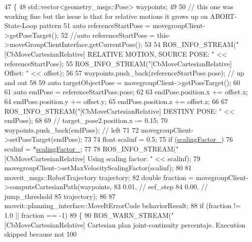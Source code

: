 \begin{DoxyCode}
47 \{
48   std::vector<geometry\_msgs::Pose> waypoints;
49 
50   \textcolor{comment}{// this one was working fine but the issue is that for relative motions it grows up on ABORT-State-Loop
       pattern}
51   \textcolor{keyword}{auto} referenceStartPose = movegroupClient->getPoseTarget(); 
52   \textcolor{comment}{//auto referenceStartPose = this->moveGroupClientInterface.getCurrentPose();}
53 
54   ROS\_INFO\_STREAM(\textcolor{stringliteral}{"[CbMoveCartesianRelative] RELATIVE MOTION, SOURCE POSE: "} << referenceStartPose);
55   ROS\_INFO\_STREAM(\textcolor{stringliteral}{"[CbMoveCartesianRelative] Offset: "} << offset);
56 
57   waypoints.push\_back(referenceStartPose.pose);  \textcolor{comment}{// up and out}
58 
59   \textcolor{keyword}{auto} targetObjectPose = movegroupClient->getPoseTarget();
60 
61   \textcolor{keyword}{auto} endPose = referenceStartPose.pose;
62 
63   endPose.position.x += offset.x;
64   endPose.position.y += offset.y;
65   endPose.position.z += offset.z;
66 
67   ROS\_INFO\_STREAM(\textcolor{stringliteral}{"[CbMoveCartesianRelative] DESTINY POSE: "} << endPose);
68 
69   \textcolor{comment}{// target\_pose2.position.x -= 0.15;}
70   waypoints.push\_back(endPose);  \textcolor{comment}{// left}
71 
72   movegroupClient->setPoseTarget(endPose);
73 
74   \textcolor{keywordtype}{float} scalinf = 0.5;
75   \textcolor{keywordflow}{if} (\hyperlink{classmove__group__interface__client_1_1CbMoveCartesianRelative_a62cdf88c437312ac79c8acc01519d634}{scalingFactor\_})
76     scalinf = *\hyperlink{classmove__group__interface__client_1_1CbMoveCartesianRelative_a62cdf88c437312ac79c8acc01519d634}{scalingFactor\_};
77 
78   ROS\_INFO\_STREAM(\textcolor{stringliteral}{"[CbMoveCartesianRelative] Using scaling factor: "} << scalinf);
79   movegroupClient->setMaxVelocityScalingFactor(scalinf);
80 
81   moveit\_msgs::RobotTrajectory trajectory;
82   \textcolor{keywordtype}{double} fraction = movegroupClient->computeCartesianPath(waypoints,
83                                                           0.01,  \textcolor{comment}{// eef\_step}
84                                                           0.00,  \textcolor{comment}{// jump\_threshold}
85                                                           trajectory);
86 
87   moveit::planning\_interface::MoveItErrorCode behaviorResult;
88   \textcolor{keywordflow}{if} (fraction != 1.0 || fraction == -1)
89   \{
90     ROS\_WARN\_STREAM(\textcolor{stringliteral}{"[CbMoveCartesianRelative] Cartesian plan joint-continuity percentaje. Execution
       skipped because not 100%
}
\end{DoxyCode}
